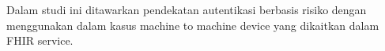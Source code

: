 Dalam studi ini ditawarkan pendekatan autentikasi berbasis risiko dengan menggunakan dalam kasus machine to machine device yang dikaitkan dalam FHIR service.



